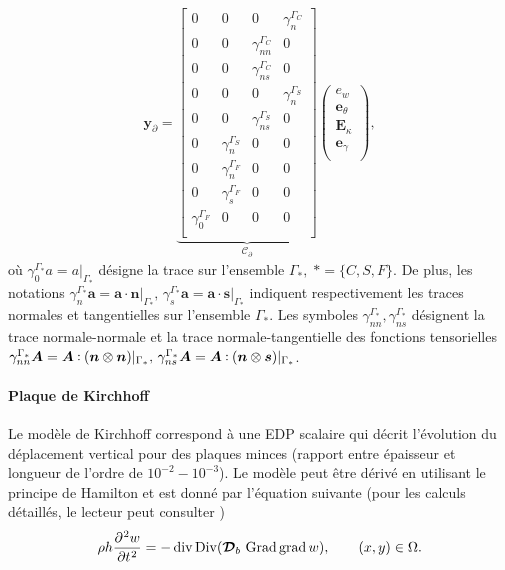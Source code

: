 \begin{equation*}
\begin{aligned}
\bm{y}_\partial = \underbrace{
	\begin{bmatrix}
	{0} & {0} & {0} & \gamma_{n}^{\Gamma_C} \\
	{0} & {0} & \gamma_{nn}^{\Gamma_C} & {0} \\
	{0} & {0} & \gamma_{ns}^{\Gamma_C} & {0} \\
	{0} & {0} & {0} & \gamma_{n}^{\Gamma_S} \\
	{0} & {0} & \gamma_{ns}^{\Gamma_S} & {0} \\
	{0} & \gamma_{n}^{\Gamma_S} & {0} & {0} \\
	{0} & \gamma_{n}^{\Gamma_F} & {0} & {0} \\
	{0} & \gamma_{s}^{\Gamma_F} & {0} & {0} \\
	\gamma_{0}^{\Gamma_F} & {0} & {0} & {0} \\
	\end{bmatrix}}_{\mathcal{C}_\partial}
\begin{pmatrix}
e_w \\
\bm{e}_{\theta} \\
\bm{E}_{\kappa} \\
\bm{e}_{\gamma} \\
\end{pmatrix},
\end{aligned}
\end{equation*}
où $\gamma_{0}^{\Gamma_*} a = a \vert_{\Gamma_*} $ désigne la trace sur l'ensemble $\Gamma_*,  \; *=\{C,S,F\}$. De plus, les notations $\gamma_{n}^{\Gamma_*} \bm{a} = \bm{a} \cdot \bm{n} \vert_{\Gamma_*}, \, \gamma_{s}^{\Gamma_*} \bm{a} = \bm{a} \cdot \bm{s} \vert_{\Gamma_*} $ indiquent respectivement les traces normales et tangentielles sur l'ensemble $\Gamma_* $. Les symboles $\gamma_{nn}^{\Gamma_*}, \gamma_{ns}^{\Gamma_*} $ désignent la trace normale-normale et la trace normale-tangentielle des fonctions tensorielles $\gamma_{nn}^{\Gamma_*} \bm{A} = \bm{A} \cddot (\bm{n} \otimes \bm{n}) \vert_{\Gamma_*}, \, \gamma_{ns}^{\Gamma_*} \bm{A} = \bm{A} \cddot (\bm{n} \otimes \bm{s}) \vert_{\Gamma_*} $. 

\paragraph{Plaque de Kirchhoff}
Le modèle de Kirchhoff correspond à une EDP scalaire qui décrit l'évolution du déplacement vertical pour des plaques minces (rapport entre épaisseur et longueur de l'ordre de $10^{-2}-10^{-3}$). Le modèle peut être dérivé en utilisant le principe de Hamilton et est donné par l'équation suivante (pour les calculs détaillés, le lecteur peut consulter \cite[Chapter 3]{reddy2006theory})
\begin{equation*}
\rho h \diffp[2]{w}{t} = - \div\Div (\bm{\mathcal{D}}_b\, \Grad\grad{w}), \qquad (x,y) \in \Omega.
\end{equation*}

